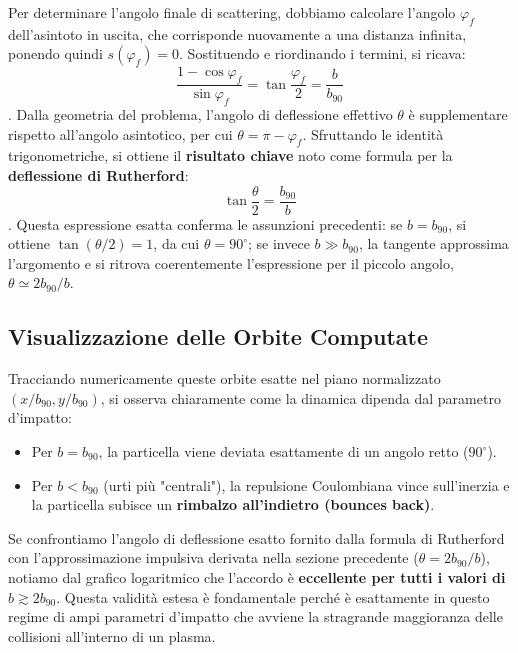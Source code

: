 Per determinare l'angolo finale di scattering, dobbiamo calcolare l'angolo $\varphi_f$ dell'asintoto in uscita, che corrisponde nuovamente a una distanza infinita, ponendo quindi $s(\varphi_f) = 0$. Sostituendo e riordinando i termini, si ricava:
\begin{equation}
\frac{1 - \cos\varphi_f}{\sin\varphi_f} = \tan\frac{\varphi_f}{2} = \frac{b}{b_{90}}
\end{equation}
.
Dalla geometria del problema, l'angolo di deflessione effettivo $\theta$ è supplementare rispetto all'angolo asintotico, per cui $\theta = \pi - \varphi_f$. Sfruttando le identità trigonometriche, si ottiene il \textbf{risultato chiave} noto come formula per la \textbf{deflessione di Rutherford}:
\begin{equation}
\tan\frac{\theta}{2} = \frac{b_{90}}{b}
\end{equation}
.
Questa espressione esatta conferma le assunzioni precedenti: se $b = b_{90}$, si ottiene $\tan(\theta/2) = 1$, da cui $\theta = 90^\circ$; se invece $b \gg b_{90}$, la tangente approssima l'argomento e si ritrova coerentemente l'espressione per il piccolo angolo, $\theta \simeq 2b_{90}/b$.

\subsection{Visualizzazione delle Orbite Computate}
Tracciando numericamente queste orbite esatte nel piano normalizzato $(x/b_{90}, y/b_{90})$, si osserva chiaramente come la dinamica dipenda dal parametro d'impatto:
\begin{itemize}
\item Per $b = b_{90}$, la particella viene deviata esattamente di un angolo retto ($90^\circ$).
\item Per $b < b_{90}$ (urti più "centrali"), la repulsione Coulombiana vince sull'inerzia e la particella subisce un \textbf{rimbalzo all'indietro (bounces back)}.
\end{itemize}

Se confrontiamo l'angolo di deflessione esatto fornito dalla formula di Rutherford con l'approssimazione impulsiva derivata nella sezione precedente ($\theta = 2b_{90}/b$), notiamo dal grafico logaritmico che l'accordo è \textbf{eccellente per tutti i valori di $b \gtrsim 2b_{90}$}. Questa validità estesa è fondamentale perché è esattamente in questo regime di ampi parametri d'impatto che avviene la stragrande maggioranza delle collisioni all'interno di un plasma.

